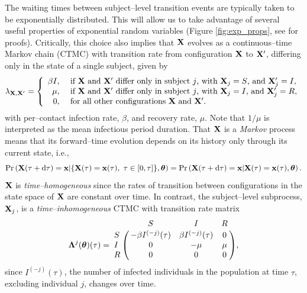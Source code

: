 The waiting times between subject--level transition events are typically taken to be exponentially distributed. This will allow us to take advantage of several useful properties of exponential random variables (Figure \ref{fig:exp_props}, see \cite{wilkinson2011stochastic} for proofs). Critically, this choice also implies that $ \mathbf{X} $ evolves as a continuous--time Markov chain (CTMC) with transition rate from configuration $ \mathbf{X} $ to $ \mathbf{X}^\prime $, differing only in the state of a single subject, given by
\begin{equation}
\lambda_{\mathbf{X},\mathbf{X}^\prime} = \left \lbrace \begin{array}{rl}
\beta I,\ &\text{if } \mathbf{X}\ \text{and } \mathbf{X}^\prime\ \text{differ only in subject }j \text{, with }\mathbf{X}_j=S\text{, and }\mathbf{X}_j^\prime=I,\\
\mu,\ &\text{if } \mathbf{X}\ \text{and } \mathbf{X}^\prime\ \text{differ only in subject }j \text{, with }\mathbf{X}_j=I\text{, and }\mathbf{X}_j^\prime=R,\\
0,\ & \text{for all other configurations }\mathbf{X}\ \text{and }\mathbf{X}^\prime.
\end{array}\right.
\end{equation}
with per--contact infection rate,  $ \beta $, and recovery rate, $ \mu $. Note that $ 1/\mu $ is interpreted as the mean infectious period duration. That $ \mathbf{X} $ is a \textit{Markov} process means that its forward--time evolution depends on its history only through its current state, i.e.,
\begin{equation}
\label{eqn:sir_markov}
\Pr\left (\bX(\tau + \dtau) = \bx | \lbrace\bX(\tau) = \bx(\tau),\ \tau\in[0,\tau]\rbrace, \btheta\right ) = \Pr\left (\bX(\tau + \dtau) = \bx | \bX(\tau) = \bx(\tau),\btheta\right ).
\end{equation}
$ \mathbf{X} $ is \textit{time--homogeneous} since the rates of transition between configurations in the state space of $ \mathbf{X} $ are constant over time. In contrast, the subject--level subprocess, $ \mathbf{X}_j $, is a \textit{time--inhomogeneous} CTMC with transition rate matrix
\begin{equation} 
\label{eqn:sir_subj_rate_mtx}
\bLambda^{j}(\btheta)(\tau) = \bordermatrix{ & S & I & R \cr
	S & -\beta I^{(-j)}(\tau) & \beta I^{(-j)}(\tau) & 0 \cr 
	I & 0 & -\mu & \mu \cr
	R & 0 & 0 & 0 },
\end{equation}
 since $ I^{(-j)}(\tau) $, the number of infected individuals in the population at time $ \tau $, excluding individual $ j $, changes over time. 

